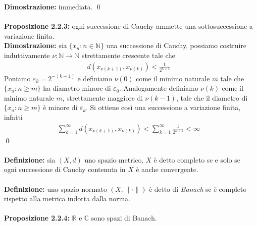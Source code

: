 \documentclass{article}
\numberwithin{equation}{subsection}
\begin{document}
\textbf{Dimostrazione:} immediata. \qed  \\ \\
\textbf{Proposizione 2.2.3:} ogni successione di Cauchy ammette una sottosuccessione a variazione finita. \\

\textbf{Dimostrazione:} sia $\{x_n : n \in \mathbb{N}\}$ una successione di Cauchy, possiamo costruire induttivamente $\nu : \mathbb{N} \longrightarrow \mathbb{N}$ strettamente crescente tale che
\begin{align*}
    d(x_{\nu(k + 1)}, x_{\nu(k)}) < \frac{1}{2^{k + 1}} 
\end{align*}
Poniamo $\varepsilon_k = 2^{-(k + 1)}$ e definiamo $\nu(0)$ come il minimo naturale $m$ tale che $\{x_n : n \geq m\}$ ha diametro minore di $\varepsilon_0$. Analogamente definiamo $\nu(k)$ come il minimo naturale $m$, strettamente maggiore di $\nu(k - 1)$, tale che il diametro di $\{x_n : n \geq m\}$ è minore di $\varepsilon_k$. Si ottiene così una successione a variazione finita, infatti
\begin{align*}
    \sum_{k = 1}^\infty d(x_{\nu(k + 1)}, x_{\nu(k)}) < \sum_{k = 1}^\infty \frac{1}{2^{k + 1}} < \infty 
\end{align*} \qed \\ \\
\textbf{Definizione:} sia $(X, d)$ uno spazio metrico, $X$ è detto completo se e solo se ogni successione di Cauchy contenuta in $X$ è anche convergente. \\ \\
\textbf{Definizione:} uno spazio normato $(X, \|\cdot\|)$ è detto di \textit{Banach} se è completo rispetto alla metrica indotta dalla norma. \\ \\
\textbf{Proposizione 2.2.4:} $\mathbb{R}$ e $\mathbb{C}$ sono spazi di Banach. \\
\end{document}
